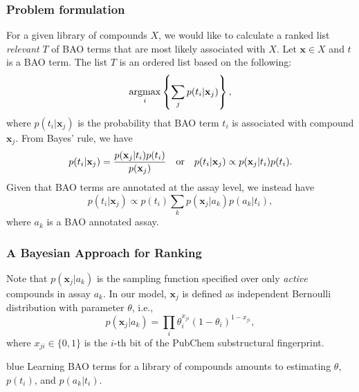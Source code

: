 \documentclass[anchorcolor=blue,linkcolor=blue]{beamer}
\newcommand{\argmax}{\operatornamewithlimits{argmax}}
\begin{document}
\begin{frame}
  \frametitle{Problem formulation}
  For a given library of compounds $X$, we would like to calculate a
  ranked list \emph{relevant} $T$ of BAO terms that are most likely associated with
  $X$. Let $\mathbf{x} \in X$ and $t$ is a BAO term. The list $T$ is
  an ordered list based on the following:
  \begin{equation}
  \argmax_{i}\left\{\sum_jp(t_i|\mathbf{x}_j)\right\},
  \end{equation}
  where $p(t_i|\mathbf{x}_j)$ is the probability that BAO term $t_i$
  is associated with compound $\mathbf{x}_j$. From Bayes' rule, we have
  \[
    p(t_i|\mathbf{x}_j) = \frac{p(\mathbf{x}_j|t_i)p(t_i)}{p(\mathbf{x}_j)}
    \quad\hbox{or} \quad p(t_i|\mathbf{x}_j) \propto p(\mathbf{x}_j|t_i)p(t_i).
  \]
  Given that BAO terms are annotated at the assay level, we instead
  have 
  \begin{equation}
    p(t_i|\mathbf{x}_j) \propto p(t_i)\sum_kp(\mathbf{x}_j|a_k)p(a_k|t_i),
  \end{equation}
  where $a_k$ is a BAO annotated assay.
\end{frame}

\begin{frame}
  \frametitle{A Bayesian Approach for Ranking}
  Note that $p(\mathbf{x}_j|a_k)$ is the sampling function specified
  over only \emph{active} compounds in assay $a_k$. In our model,
  $\mathbf{x}_j$ is defined as independent Bernoulli distribution with
  parameter $\theta$, i.e., 
\[ p(\mathbf{x}_j|a_k) =
\prod_i\theta_i^{x_{ji}}(1-\theta_i)^{1-x_{ji}},\]
where $x_{ji}\in\{0,1\}$ is the $i$-th bit of the PubChem
substructural fingerprint. 

\begin{block}{}
\begin{color}{blue}
Learning BAO terms for a library of
compounds amounts to estimating $\theta$, $p(t_i)$, and $p(a_k|t_i)$. 
\end{color}
\end{block}
\end{frame}
\end{document}
